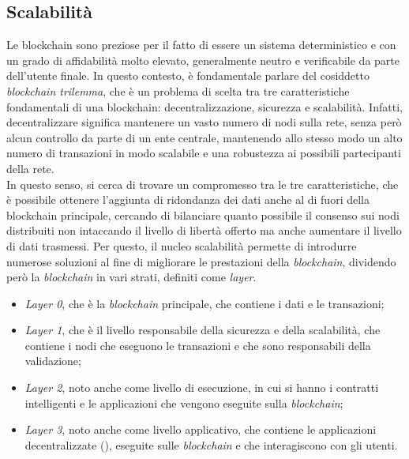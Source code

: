 \subsection{Scalabilità}\label{sec:tecnologie-blockchain-avanzate-scalabilita}
Le blockchain sono preziose per il fatto di essere un sistema deterministico e con un grado di affidabilità molto elevato, generalmente neutro e verificabile da parte dell'utente finale.
In questo contesto, è fondamentale parlare del cosiddetto \textit{blockchain trilemma}, che è un problema di scelta tra tre caratteristiche fondamentali di una blockchain: decentralizzazione, sicurezza e scalabilità.
Infatti, decentralizzare significa mantenere un vasto numero di nodi sulla rete, senza però alcun controllo da parte di un ente centrale, 
mantenendo allo stesso modo un alto numero di transazioni in modo scalabile e una robustezza ai possibili partecipanti della rete. \\

In questo senso, si cerca di trovare un compromesso tra le tre caratteristiche, che è possibile ottenere l'aggiunta di ridondanza dei dati anche al di fuori della blockchain principale,
cercando di bilanciare quanto possibile il consenso sui nodi distribuiti non intaccando il livello di libertà offerto ma anche aumentare il livello di dati trasmessi.
Per questo, il nucleo scalabilità permette di introdurre numerose soluzioni al fine di migliorare le prestazioni della \textit{blockchain}, dividendo però la \textit{blockchain} in vari strati, definiti come \textit{layer}.
\begin{itemize}
    \item{\textit{Layer 0}}, che è la \textit{blockchain} principale, che contiene i dati e le transazioni;
    \item{\textit{Layer 1}}, che è il livello responsabile della sicurezza e della scalabilità, che contiene i nodi che eseguono le transazioni e che sono responsabili della validazione;
    \item{\textit{Layer 2}}, noto anche come livello di esecuzione, in cui si hanno i contratti intelligenti e le applicazioni che vengono eseguite sulla \textit{blockchain};
    \item{\textit{Layer 3}}, noto anche come livello applicativo, che contiene le applicazioni decentralizzate (), eseguite sulle \textit{blockchain} e che interagiscono con gli utenti.
\end{itemize}

